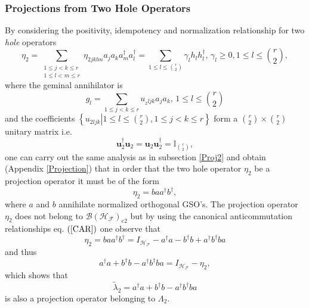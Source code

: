 \documentclass[aps,preprint]{revtex4}%
\begin{document}
\subsubsection{Projections from Two Hole Operators}

By considering the positivity, idempotency and normalization relationship for
two \emph{hole} operators
\begin{equation}
\eta_{2}=\sum_{\substack{1\leq j<k\leq r\\1\leq l<m\leq r}}\eta_{2jklm}%
a_{j}a_{k}a_{m}^{\dagger}a_{l}^{\dagger}=\sum_{1\leq l\leq\binom{r}{2}}%
\gamma_{l}h_{l}h_{l}^{\dagger},\,\gamma_{l}\geq0,1\leq l\leq\binom{r}{2},
\end{equation}
where the geminal annihilator is
\begin{equation}
g_{l}=\sum_{1\leq j<k\leq r}u_{_{2}ljk}a_{j}a_{k},\,1\leq l\leq\binom{r}{2}%
\end{equation}
and the coefficients $\left\{  \left.  u_{2ljk}\right\vert 1\leq l\leq
\binom{r}{2},1\leq j<k\leq r\right\}  $ form a $\binom{r}{2}\times\binom{r}%
{2}$ unitary matrix i.e.
\begin{equation}
\mathbf{u}_{2}^{\dagger}\mathbf{u}_{2}=\mathbf{u}_{2}\mathbf{u}_{2}^{\dagger
}=\mathbb{I}_{\binom{r}{2}},
\end{equation}
one can carry out the same analysis as in subsection \ref{Proj2} and obtain
(Appendix \ref{Projection}) that in order that the two hole operator $\eta
_{2}$ be a projection operator it must be of the form
\begin{equation}
\eta_{2}=baa^{\dagger}b^{\dagger},
\end{equation}
where $a$ and $b$ annihilate normalized orthogonal GSO's. The projection
operator $\eta_{2}$ does not belong to $\mathcal{B}\left(  \mathcal{H}%
_{\mathcal{F}}\right)  _{e2}$ but by using the canonical anticommutation
relationships eq. $\left(  \ref{CAR}\right)  $ one observe that
\begin{equation}
\eta_{2}=baa^{\dagger}b^{\dagger}=I_{\mathcal{H}_{\mathcal{F}}}-a^{\dagger
}a-b^{\dagger}b+a^{\dagger}b^{\dagger}ba
\end{equation}
and thus
\begin{equation}
a^{\dagger}a+b^{\dagger}b-a^{\dagger}b^{\dagger}ba=I_{\mathcal{H}%
_{\mathcal{F}}}-\eta_{2},
\end{equation}
which shows that
\begin{equation}
\tilde{\lambda}_{2}=a^{\dagger}a+b^{\dagger}b-a^{\dagger}b^{\dagger}ba
\end{equation}
is also a projection operator belonging to $\Lambda_{2}.$
\end{document}
